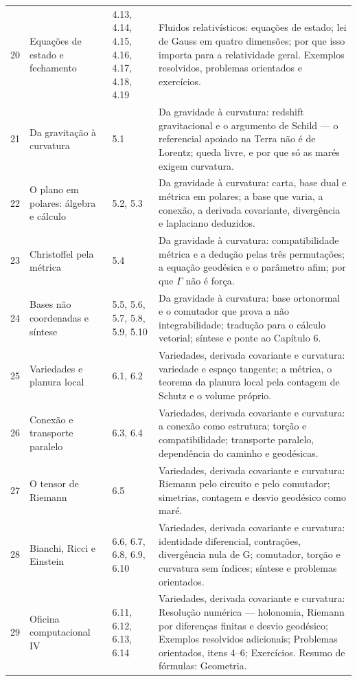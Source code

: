 \documentclass[12pt,a4paper,oneside]{book}
\theoremstyle{rgplain}
\theoremstyle{rgremark}
\begin{document}
\begin{longtable}{cp{3.3cm}p{2.3cm}p{6.1cm}}
20 & Equações de estado e fechamento & 4.13, 4.14, 4.15, 4.16, 4.17, 4.18, 4.19 & Fluidos relativísticos: equações de estado; lei de Gauss em quatro dimensões; por que isso importa para a relatividade geral. Exemplos resolvidos, problemas orientados e exercícios. \\
21 & Da gravitação à curvatura & 5.1 & Da gravidade à curvatura: redshift gravitacional e o argumento de Schild --- o referencial apoiado na Terra não é de Lorentz; queda livre, e por que só as marés exigem curvatura. \\
22 & O plano em polares: álgebra e cálculo & 5.2, 5.3 & Da gravidade à curvatura: carta, base dual e métrica em polares; a base que varia, a conexão, a derivada covariante, divergência e laplaciano deduzidos. \\
23 & Christoffel pela métrica & 5.4 & Da gravidade à curvatura: compatibilidade métrica e a dedução pelas três permutações; a equação geodésica e o parâmetro afim; por que $\Gamma$ não é força. \\
24 & Bases não coordenadas e síntese & 5.5, 5.6, 5.7, 5.8, 5.9, 5.10 & Da gravidade à curvatura: base ortonormal e o comutador que prova a não integrabilidade; tradução para o cálculo vetorial; síntese e ponte ao Capítulo 6. \\
25 & Variedades e planura local & 6.1, 6.2 & Variedades, derivada covariante e curvatura: variedade e espaço tangente; a métrica, o teorema da planura local pela contagem de Schutz e o volume próprio. \\
26 & Conexão e transporte paralelo & 6.3, 6.4 & Variedades, derivada covariante e curvatura: a conexão como estrutura; torção e compatibilidade; transporte paralelo, dependência do caminho e geodésicas. \\
27 & O tensor de Riemann & 6.5 & Variedades, derivada covariante e curvatura: Riemann pelo circuito e pelo comutador; simetrias, contagem e desvio geodésico como maré. \\
28 & Bianchi, Ricci e Einstein & 6.6, 6.7, 6.8, 6.9, 6.10 & Variedades, derivada covariante e curvatura: identidade diferencial, contrações, divergência nula de G; comutador, torção e curvatura sem índices; síntese e problemas orientados. \\
29 & Oficina computacional IV & 6.11, 6.12, 6.13, 6.14 & Variedades, derivada covariante e curvatura: Resolução numérica --- holonomia, Riemann por diferenças finitas e desvio geodésico; Exemplos resolvidos adicionais; Problemas orientados, itens 4--6; Exercícios. Resumo de fórmulas: Geometria. \\

\end{longtable}
\end{document}
